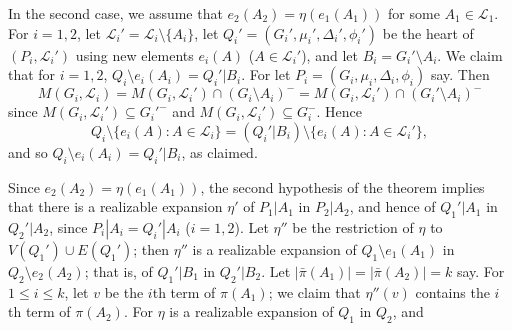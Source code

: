 In the second case, we assume that $e_2(A_2) = \eta(e_1(A_1))$ for some $A_1 \in \mathscr{L}_1$. For $i = 1, 2$, let $\mathscr{L}_i' = \mathscr{L}_i \setminus \{A_i\}$, let $Q_i' = (G_i', \mu_i', \Delta_i', \phi_i')$ be the heart of $(P_i, \mathscr{L}_i')$ using new elements $e_i(A)$ ($A \in \mathscr{L}_i'$), and let $B_i = G_i' \setminus A_i$. We claim that for $i = 1, 2$, $Q_i \setminus e_i(A_i) = Q_i'|B_i$. For let $P_i = (G_i, \mu_i, \Delta_i, \phi_i)$ say. Then
\begin{equation*}
M(G_i, \mathscr{L}_i) = M(G_i, \mathscr{L}_i') \cap (G_i \setminus A_i)^- = M(G_i, \mathscr{L}_i') \cap (G_i' \setminus A_i)^-
\end{equation*}
since $M(G_i, \mathscr{L}_i') \subseteq G_i'^-$ and $M(G_i, \mathscr{L}_i') \subseteq G_i^-$. Hence
\begin{equation*}
Q_i \setminus \{e_i(A) : A \in \mathscr{L}_i\} = (Q_i'|B_i) \setminus \{e_i(A) : A \in \mathscr{L}_i'\},
\end{equation*}
and so $Q_i \setminus e_i(A_i) = Q_i'|B_i$, as claimed.

Since $e_2(A_2) = \eta(e_1(A_1))$, the second hypothesis of the theorem implies that there is a realizable expansion $\eta'$ of $P_1|A_1$ in $P_2|A_2$, and hence of $Q_1'|A_1$ in $Q_2'|A_2$, since $P_i|A_i = Q_i'|A_i$ ($i = 1, 2$). Let $\eta''$ be the restriction of $\eta$ to $V(Q_1') \cup E(Q_1')$; then $\eta''$ is a realizable expansion of $Q_1 \setminus e_1(A_1)$ in $Q_2 \setminus e_2(A_2)$; that is, of $Q_1'|B_1$ in $Q_2'|B_2$. Let $|\bar{\pi}(A_1)| = |\bar{\pi}(A_2)| = k$ say. For $1 \le i \le k$, let $v$ be the $i$th term of $\pi(A_1)$; we claim that $\eta''(v)$ contains the $i$th term of $\pi(A_2)$. For $\eta$ is a realizable expansion of $Q_1$ in $Q_2$, and
